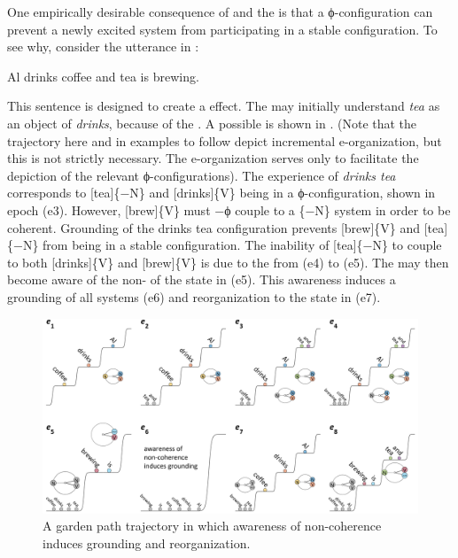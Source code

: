   One empirically desirable consequence of  and the  is that a ϕ-con\-fi\-gu\-ra\-tion can prevent a newly excited system from participating in a stable configuration. To see why, consider the utterance in : 

\ea\label{ex:6:12}
Al drinks coffee and tea is brewing.
\z   

  This sentence is designed to create a  effect. The  may initially understand \textit{tea} as an object of \textit{drinks}, because of the . A possible  is shown in {}. (Note that the trajectory here and in examples to follow depict incremental e-or\-ga\-ni\-za\-tion, but this is not strictly necessary. The e-or\-ga\-ni\-za\-tion serves only to facilitate the depiction of the relevant ϕ-con\-fi\-gu\-ra\-tions). The   experience of \textit{drinks tea} corresponds to [tea]\{−N\} and [drinks]\{V\} being in a ϕ-con\-fi\-gu\-ra\-tion, shown in epoch (e3).  However, [brew]\{V\} must −ϕ couple to a \{−N\} system in order to be coherent. Grounding of the {\textbar}drinks tea{\textbar} configuration prevents [brew]\{V\} and [tea]\{−N\} from being in a stable configuration. The inability of [tea]\{−N\} to couple to both [drinks]\{V\} and [brew]\{V\} is due to the  from (e4) to (e5). The  may then become aware of the non- of the state in (e5). This awareness induces a grounding of all systems (e6) and reorganization to the state in (e7). 

  
\begin{figure}
\includegraphics[width=\textwidth]{figures/Tilsen-img130.png}
\caption{A garden path trajectory in which awareness of non-coherence induces grounding and reorganization.}
\label{fig:6:11}
\end{figure}
 

